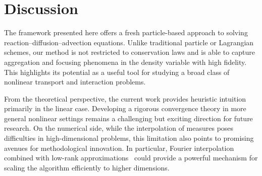 \documentclass[12pt]{article}
\begin{document}
\section{Discussion}
The framework presented here offers a fresh particle-based approach to solving reaction–diffusion–advection equations. Unlike traditional particle or Lagrangian schemes, our method is not restricted to conservation laws and is able to capture aggregation and focusing phenomena in the density variable with high fidelity. This highlights its potential as a useful tool for studying a broad class of nonlinear transport and interaction problems.

From the theoretical perspective, the current work provides heuristic intuition primarily in the linear case. Developing a rigorous convergence theory in more general nonlinear settings remains a challenging but exciting direction for future research. On the numerical side, while the interpolation of measures poses difficulties in high-dimensional problems, this limitation also points to promising avenues for methodological innovation. In particular, Fourier interpolation combined with low-rank approximations~\cite{tang2025solving} could provide a powerful mechanism for scaling the algorithm efficiently to higher dimensions.






\clearpage
\end{document}
